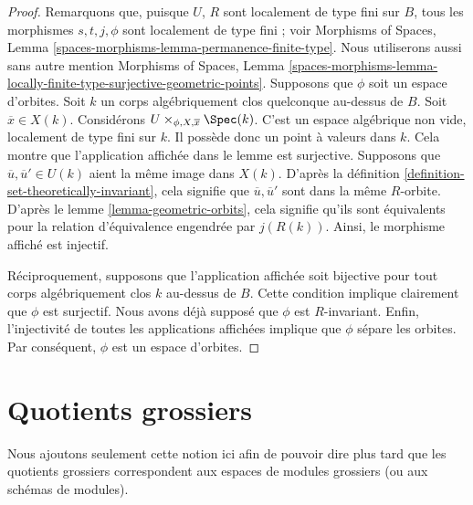 \begin{proof}
Remarquons que, puisque $U$, $R$ sont localement de type fini sur $B$, tous les
morphismes $s, t, j, \phi$ sont localement de type fini ; voir
Morphisms of Spaces, Lemma \ref{spaces-morphisms-lemma-permanence-finite-type}.
Nous utiliserons aussi sans autre mention
Morphisms of Spaces, Lemma
\ref{spaces-morphisms-lemma-locally-finite-type-surjective-geometric-points}.
Supposons que $\phi$ soit un espace d'orbites. Soit $k$ un corps algébriquement clos
quelconque au-dessus de $B$. Soit $\overline{x} \in X(k)$. Considérons
$U \times_{\phi, X, \overline{x}} \Spec(k)$.
C'est un espace algébrique non vide,
localement de type fini sur $k$. Il possède donc un point à valeurs dans $k$.
Cela montre que l'application affichée dans le lemme est surjective.
Supposons que $\overline{u}, \overline{u}' \in U(k)$ aient la même
image dans $X(k)$. D'après la
définition \ref{definition-set-theoretically-invariant},
cela signifie que $\overline{u}, \overline{u}'$ sont dans la même
$R$-orbite. D'après le lemme \ref{lemma-geometric-orbits}, cela signifie qu'ils
sont équivalents pour la relation d'équivalence engendrée par
$j(R(k))$. Ainsi, le morphisme affiché est injectif.

\medskip\noindent
Réciproquement, supposons que l'application affichée soit bijective pour tout corps
algébriquement clos $k$ au-dessus de $B$. Cette condition implique clairement que $\phi$
est surjectif. Nous avons déjà supposé que $\phi$ est $R$-invariant.
Enfin, l'injectivité de toutes les applications affichées implique que
$\phi$ sépare les orbites. Par conséquent, $\phi$ est un espace d'orbites.
\end{proof}










\section{Quotients grossiers}
\label{section-coarse}

\noindent
Nous ajoutons seulement cette notion ici afin de pouvoir dire plus tard que les quotients
grossiers correspondent aux espaces de modules grossiers (ou aux schémas de modules).

